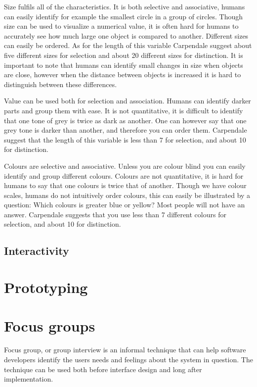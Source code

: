 Size fulfils all of the characteristics. It is both selective and associative, humans can easily identify for example the smallest circle in a group of circles. Though size can be used to visualize a numerical value, it is often hard for humans to accurately see how much large one object is compared to another. Different sizes can easily be ordered. As for the length of this variable Carpendale suggest about five different sizes for selection and about 20 different sizes for distinction. It is important to note that humans can identify small changes in size when objects are close, however when the distance between objects is increased it is hard to distinguish between these differences.

Value can be used both for selection and association. Humans can identify darker parts and group them with ease. It is not quantitative, it is difficult to identify that one tone of grey is twice as dark as another. One can however say that one grey tone is darker than another, and therefore you can order them. Carpendale suggest that the length of this variable is less than 7 for selection, and about 10 for distinction.

Colours are selective and associative. Unless you are colour blind you can easily identify and group different colours. Colours are not quantitative, it is hard for humans to say that one colours is twice that of another. Though we have colour scales, humans do not intuitively order colours, this can easily be illustrated by a question: Which colours is greater blue or yellow? Most people will not have an answer. Carpendale suggests that you use less than 7 different colours for selection, and about 10 for distinction.

\subsection{Interactivity}

\section{Prototyping}

\section{Focus groups}
Focus group, or group interview is an informal technique that can help software developers identify the users needs and feelings about the system in question. The technique can be used both before interface design and long after implementation. 

